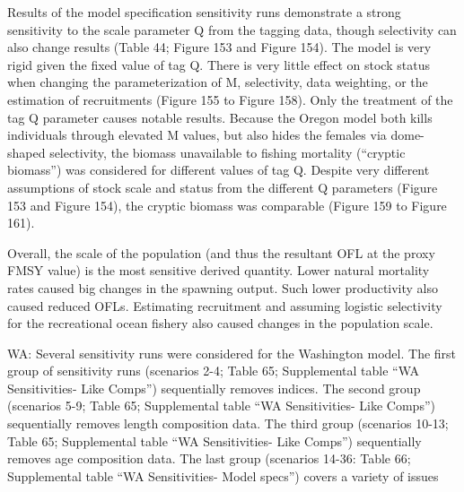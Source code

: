 \documentclass[11pt,
  english,
  letterpaper,
]{article}
\begin{document}
Results of the model specification sensitivity runs demonstrate a strong sensitivity to the scale parameter Q from the tagging data, though selectivity can also change results (Table 44; Figure 153 and Figure 154). The model is very rigid given the fixed value of tag Q. There is very little effect on stock status when changing the parameterization of M, selectivity, data weighting, or the estimation of recruitments (Figure 155 to Figure 158). Only the treatment of the tag Q parameter causes notable results. Because the Oregon model both kills individuals through elevated M values, but also hides the females via dome-shaped selectivity, the biomass unavailable to fishing mortality (``cryptic biomass'') was considered for different values of tag Q. Despite very different assumptions of stock scale and status from the different Q parameters (Figure 153 and Figure 154), the cryptic biomass was comparable (Figure 159 to Figure 161).

Overall, the scale of the population (and thus the resultant OFL at the proxy FMSY value) is the most sensitive derived quantity. Lower natural mortality rates caused big changes in the spawning output. Such lower productivity also caused reduced OFLs. Estimating recruitment and assuming logistic selectivity for the recreational ocean fishery also caused changes in the population scale.

WA: Several sensitivity runs were considered for the Washington model. The first group of sensitivity runs (scenarios 2-4; Table 65; Supplemental table ``WA Sensitivities- Like Comps'') sequentially removes indices. The second group (scenarios 5-9; Table 65; Supplemental table ``WA Sensitivities- Like Comps'') sequentially removes length composition data. The third group (scenarios 10-13; Table 65; Supplemental table ``WA Sensitivities- Like Comps'') sequentially removes age composition data. The last group (scenarios 14-36: Table 66; Supplemental table ``WA Sensitivities- Model specs'') covers a variety of issues
\end{document}
